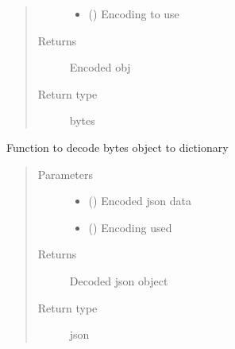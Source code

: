 \documentclass[letterpaper,10pt,english]{sphinxmanual}
\begin{document}
\begin{fulllineitems}
\begin{fulllineitems}
\begin{quote}
\begin{description}
\begin{itemize}
\item {} 
 () \textendash{} Encoding to use

\end{itemize}

\item[{Returns}] \leavevmode
Encoded obj

\item[{Return type}] \leavevmode
bytes

\end{description}\end{quote}

\end{fulllineitems}


\begin{fulllineitems}
\label{\detokenize{Message:Message.Message._json_decode}}
Function to decode bytes object to dictionary
\begin{quote}\begin{description}
\item[{Parameters}] \leavevmode\begin{itemize}
\item {} 
 () \textendash{} Encoded json data

\item {} 
 () \textendash{} Encoding used

\end{itemize}

\item[{Returns}] \leavevmode
Decoded json object

\item[{Return type}] \leavevmode
json

\end{description}\end{quote}

\end{fulllineitems}



\end{fulllineitems}
\end{document}
